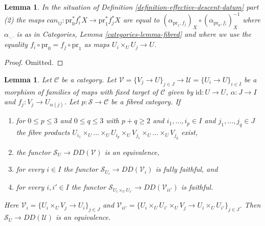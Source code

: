 \documentclass{stacks-project}
\theoremstyle{plain}
\newtheorem{lemma}[subsection]{Lemma}
\theoremstyle{definition}
\theoremstyle{remark}
\numberwithin{equation}{subsection}
\begin{document}
\begin{lemma}
\label{lemma-trivial-cocycle}
In the situation of
Definition \ref{definition-effective-descent-datum} part (2) the maps
$can_{ij} : \text{pr}_0^*f_i^*X \to \text{pr}_1^*f_j^*X$ are equal to
$(\alpha_{\text{pr}_1, f_j})_X \circ (\alpha_{\text{pr}_0, f_i})_X^{-1}$
where $\alpha_{\cdot, \cdot}$ is as in
Categories, Lemma \ref{categories-lemma-fibred}
and where we
use the equality $f_i \circ \text{pr}_0 = f_j \circ \text{pr}_1$
as maps $U_i \times_U U_j \to U$.
\end{lemma}

\begin{proof}
Omitted.
\end{proof}

\begin{lemma}
\label{lemma-compare-descent-condition}
Let $\mathcal{C}$ be a category. Let
$\mathcal{V} = \{V_j \to U\}_{j \in J} \to
\mathcal{U} = \{U_i \to U\}_{i \in I}$
be a morphism of families of maps with fixed target of
$\mathcal{C}$ given by $\text{id} : U \to U$,
$\alpha : J \to I$ and $f_j : V_j \to U_{\alpha(j)}$. Let
$p : \mathcal{S} \to \mathcal{C}$ be a fibred category. If
\begin{enumerate}
\item for $0 \leq p \leq 3$ and $0 \leq q \leq 3$ with $p + q \geq 2$
and $i_1, \ldots, i_p \in I$ and $j_1, \ldots, j_q \in J$
the fibre products $U_{i_1} \times_U \ldots \times_U U_{i_p} \times_U
V_{j_1} \times_U \ldots \times_U V_{j_q}$ exist,
\item the functor $\mathcal{S}_U \to DD(\mathcal{V})$
is an equivalence,
\item for every $i \in I$ the functor
$\mathcal{S}_{U_i} \to DD(\mathcal{V}_i)$
is fully faithful, and
\item for every $i, i' \in I$ the functor
$\mathcal{S}_{U_i \times_U U_{i'}} \to DD(\mathcal{V}_{ii'})$
is faithful.
\end{enumerate}
Here $\mathcal{V}_i = \{U_i \times_U V_j \to U_i\}_{j \in J}$ and
$\mathcal{V}_{ii'} =
\{U_i \times_U U_{i'} \times_U V_j \to U_i \times_U U_{i'}\}_{j \in J}$.
Then $\mathcal{S}_U \to DD(\mathcal{U})$ is an equivalence.
\end{lemma}
\end{document}
